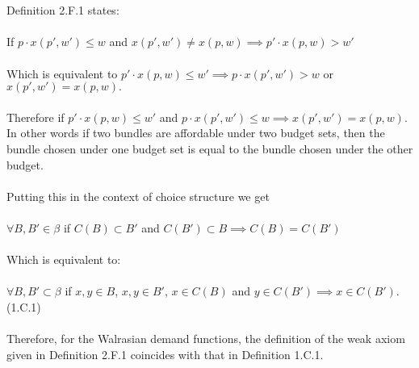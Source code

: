 \documentclass[12pt]{article}
\newenvironment{problem}[2][Problem]{\begin{trivlist}
\item[\hskip \labelsep {\bfseries #1}\hskip \labelsep {\bfseries #2.}]}{\end{trivlist}}
\begin{document}
\begin{problem}{6}. \\ \\ Definition 2.F.1 states: \\
\\
If  $ p \cdot x(p', w') \leq w$ and $x(p',w') \neq x(p,w) \implies p'  \cdot x(p, w) > w'    $
\\
\\
Which is equivalent to $ p'  \cdot x(p, w) \leq w' \implies p \cdot x(p', w') > w$ or $x(p',w') = x(p,w).$
\\
\\
Therefore if $p'  \cdot x(p, w) \leq w' $ and $ p \cdot x(p', w') \leq w \implies x(p',w') = x(p,w). $ In other words if two bundles are affordable under two budget sets, then the bundle chosen under one budget set is equal to the bundle chosen under the other budget. 
\\
\\
Putting this in the context of choice structure we get \\
\\
$ \forall B, B' \in \beta  $ if $ C(B) \subset B'  $ and $ C(B') \subset B \implies C(B) = C(B')$
\\
\\
Which is equivalent to:
\\
\\
$ \forall B, B' \subset \beta $ if $ x, y \in B$, $ x, y \in B'  $, $ x \in C(B) $ and $ y \in C(B') \implies x \in C(B'). $ (1.C.1)
\\
\\
Therefore, for the Walrasian demand functions, the definition of the weak axiom given in Definition 2.F.1 coincides with that in Definition 1.C.1.

\end{problem}
\end{document}
